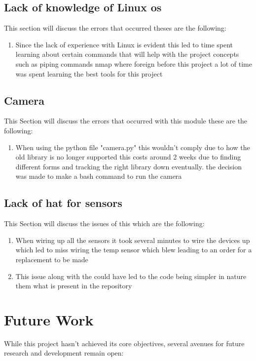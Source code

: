 \subsection{Lack of knowledge of Linux os}
This section will discuss the errors that occurred theses are the following:
\begin{enumerate}
    \item Since the lack of experience with Linux is evident  this led to time spent learning about certain commands that will help with the project concepts such as  piping  commands nmap where  foreign before this project a lot of time was spent learning the best tools for this project
\end{enumerate}
\subsection{Camera}
This Section will discuss the errors that occurred with this module these are the following:
\begin{enumerate}
    \item When using the python file "camera.py" this wouldn't comply due to how the old library is no longer supported this costs around 2 weeks due to finding different forms and tracking the right library down eventually. the decision was made to make a bash command  to run the camera
\end{enumerate}
\subsection{Lack of hat for sensors}
This Section will discuss the issues of this which are  the following:
\begin{enumerate}
    \item When wiring up all the sensors it took several minutes to wire the devices up which led to miss wiring the temp sensor which blew  leading to an order for a replacement to be made
    \item This issue along with the could have led to  the code being simpler in nature them what is present in the repository
\end{enumerate}
\section{Future Work}

While this project hasn't achieved its core objectives, several avenues for future research and development remain open:

